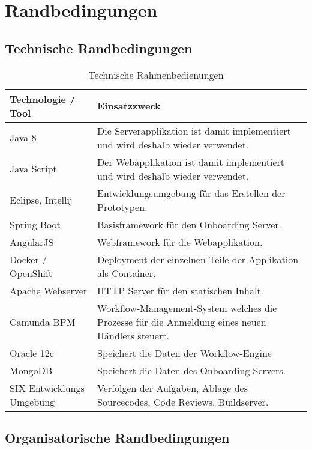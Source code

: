 \chapter{Randbedingungen}

\section{Technische Randbedingungen}

\begin{table}[H]
	\centering
	\caption{Technische Rahmenbedienungen}
	\begin{tabular}{ | p{4cm} | p{11cm} | }
		\toprule
		{\textbf{Technologie / Tool}} & {\textbf{Einsatzzweck}} \\
		\midrule
		Java 8 & Die Serverapplikation ist damit implementiert und wird deshalb wieder verwendet. \\ \hline
		Java Script & Der Webapplikation ist damit implementiert und wird deshalb wieder verwendet. \\ \hline
		Eclipse, Intellij & Entwicklungsumgebung für das Erstellen der Prototypen. \\ \hline
		Spring Boot & Basisframework für den Onboarding Server.  \\ \hline
		AngularJS & Webframework für die Webapplikation. \\ \hline
		Docker / OpenShift & Deployment der einzelnen Teile der Applikation als Container. \\ \hline
		Apache Webserver & HTTP Server für den statischen Inhalt. \\ \hline
		Camunda BPM & Workflow-Management-System welches die Prozesse für die Anmeldung eines neuen Händlers steuert. \\ \hline
		Oracle 12c & Speichert die Daten der Workflow-Engine \\ \hline
		MongoDB & Speichert die Daten des Onboarding Servers. \\ \hline
		SIX Entwicklungs Umgebung  & Verfolgen der Aufgaben, Ablage des Sourcecodes, Code Reviews, Buildserver.\\
		\bottomrule
	\end{tabular}
\end{table}

\section{Organisatorische Randbedingungen}

